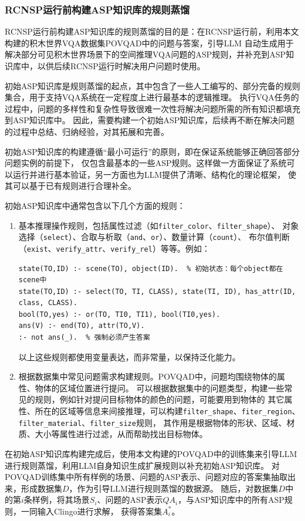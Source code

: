 \subsubsection{RCNSP运行前构建ASP知识库的规则蒸馏}
RCNSP运行前构建ASP知识库的规则蒸馏的目的是：在RCNSP运行前，利用本文构建的积木世界VQA数据集POVQAD中的问题与答案，引导LLM
自动生成用于解决部分可见积木世界场景下的空间推理VQA问题的ASP规则，并补充到ASP知识库中，以供后续RCNSP运行时解决用户问题时使用。

初始ASP知识库是规则蒸馏的起点，其中包含了一些人工编写的、部分完备的规则集合，用于支持VQA系统在一定程度上进行最基本的逻辑推理。
执行VQA任务的过程中，问题的多样性和复杂性导致很难一次性将解决问题所需的所有知识都填充到ASP知识库中。
因此，需要构建一个初始ASP知识库，后续再不断在解决问题的过程中总结、归纳经验，对其拓展和完善。

初始ASP知识库的构建遵循“最小可运行”的原则，即在保证系统能够正确回答部分问题实例的前提下，
仅包含最基本的一些ASP规则。这样做一方面保证了系统可以运行并进行基本验证，另一方面也为LLM提供了清晰、结构化的理论框架，
使其可以基于已有规则进行合理补全。

初始ASP知识库中通常包含以下几个方面的规则：
\begin{enumerate}[nosep]
\item 基本推理操作规则，包括属性过滤（如\texttt{filter\_color}、\texttt{filter\_shape}）、
对象选择（\texttt{select}）、合取与析取（\texttt{and}、\texttt{or}）、数量计算（\texttt{count}）、
布尔值判断（\texttt{exist}、\texttt{verify\_attr}、\texttt{verify\_rel}）等等。例如：
\begin{lstlisting}
state(TO,ID) :- scene(TO), object(ID).  % 初始状态：每个object都在scene中
state(TO,ID) :- select(TO, TI, CLASS), state(TI, ID), has_attr(ID, class, CLASS).
bool(TO,yes) :- or(TO, TI0, TI1), bool(TI0,yes).
ans(V) :- end(TO), attr(TO,V).
:- not ans(_).  % 强制必须产生答案
\end{lstlisting}
以上这些规则都使用变量表达，而非常量，以保持泛化能力。
\item 根据数据集中常见问题需求构建规则。POVQAD中，问题均围绕物体的属性、物体的区域位置进行提问。
可以根据数据集中的问题类型，构建一些常见的规则，例如针对提问目标物体的颜色的问题，可能要用到物体的
其它属性、所在的区域等信息来间接推理，可以构建\texttt{filter\_shape}、\texttt{fiter\_region}、
\texttt{filter\_material}、\texttt{filter\_size}规则，
其作用是根据物体的形状、区域、材质、大小等属性进行过滤，从而帮助找出目标物体。
\end{enumerate}

在初始ASP知识库构建完成后，使用本文构建的POVQAD中的训练集来引导LLM进行规则蒸馏，利用LLM自身知识生成扩展规则以补充初始ASP知识库。
对POVQAD训练集中所有样例的场景、问题的ASP表示、问题对应的答案集抽取出来，形成数据集$D$，作为引导LLM进行规则蒸馏的数据源。
随后，对数据集$D$中的第$i$条样例，将其场景$S_i$、问题的ASP表示$QA_i$，与ASP知识库中的所有ASP规则，一同输入Clingo进行求解，
获得答案集$A^*_i$。


